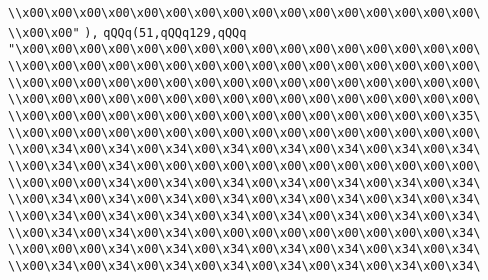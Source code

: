 \verb|\\x00\x00\x00\x00\x00\x00\x00\x00\x00\x00\x00\x00\x00\x00\x00\x00\|\newline
\verb|\\x00\x00"|\newline
\verb|),|\newline
\verb|qQQq(51,qQQq129,qQQq|\newline
\verb|"\x00\x00\x00\x00\x00\x00\x00\x00\x00\x00\x00\x00\x00\x00\x00\x00\|\newline
\verb|\\x00\x00\x00\x00\x00\x00\x00\x00\x00\x00\x00\x00\x00\x00\x00\x00\|\newline
\verb|\\x00\x00\x00\x00\x00\x00\x00\x00\x00\x00\x00\x00\x00\x00\x00\x00\|\newline
\verb|\\x00\x00\x00\x00\x00\x00\x00\x00\x00\x00\x00\x00\x00\x00\x00\x00\|\newline
\verb|\\x00\x00\x00\x00\x00\x00\x00\x00\x00\x00\x00\x00\x00\x00\x00\x35\|\newline
\verb|\\x00\x00\x00\x00\x00\x00\x00\x00\x00\x00\x00\x00\x00\x00\x00\x00\|\newline
\verb|\\x00\x34\x00\x34\x00\x34\x00\x34\x00\x34\x00\x34\x00\x34\x00\x34\|\newline
\verb|\\x00\x34\x00\x34\x00\x00\x00\x00\x00\x00\x00\x00\x00\x00\x00\x00\|\newline
\verb|\\x00\x00\x00\x34\x00\x34\x00\x34\x00\x34\x00\x34\x00\x34\x00\x34\|\newline
\verb|\\x00\x34\x00\x34\x00\x34\x00\x34\x00\x34\x00\x34\x00\x34\x00\x34\|\newline
\verb|\\x00\x34\x00\x34\x00\x34\x00\x34\x00\x34\x00\x34\x00\x34\x00\x34\|\newline
\verb|\\x00\x34\x00\x34\x00\x34\x00\x00\x00\x00\x00\x00\x00\x00\x00\x34\|\newline
\verb|\\x00\x00\x00\x34\x00\x34\x00\x34\x00\x34\x00\x34\x00\x34\x00\x34\|\newline
\verb|\\x00\x34\x00\x34\x00\x34\x00\x34\x00\x34\x00\x34\x00\x34\x00\x34\|\newline
